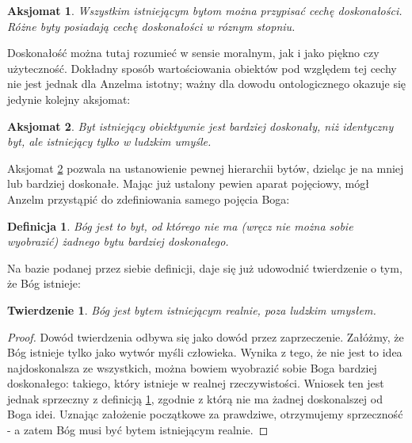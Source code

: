 \documentclass{article}
\newtheorem{theorem}{Twierdzenie}
\newtheorem{definition}{Definicja}
\newtheorem{axiom}{Aksjomat}
\begin{document}
\begin{axiom} \label{axiom:1}
	Wszystkim istniejącym bytom można przypisać cechę \emph{doskonałości}. Różne byty posiadają cechę doskonałości w róznym stopniu. 
\end{axiom}

Doskonałość można tutaj rozumieć w sensie moralnym, jak i jako piękno czy użyteczność. Dokładny sposób wartościowania obiektów pod względem tej cechy nie jest jednak dla Anzelma istotny; ważny dla dowodu ontologicznego okazuje się jedynie kolejny aksjomat:

\begin{axiom} \label{axiom:2}
	Byt istniejący obiektywnie jest bardziej doskonały, niż identyczny byt, ale istniejący tylko w ludzkim umyśle. 
\end{axiom}

Aksjomat \ref{axiom:2} pozwala na ustanowienie pewnej hierarchii bytów, dzieląc je na mniej lub bardziej doskonałe. Mając już ustalony pewien aparat pojęciowy, mógł Anzelm przystąpić do zdefiniowania samego pojęcia Boga:

\begin{definition} \label{def:god}
	Bóg jest to byt, od którego nie ma (wręcz nie można sobie wyobrazić) żadnego bytu bardziej doskonałego. 
\end{definition}

Na bazie podanej przez siebie definicji, daje się już udowodnić twierdzenie o tym, że Bóg istnieje:

\begin{theorem} \label{theorem:god}
	Bóg jest bytem istniejącym realnie, poza ludzkim umysłem. 
\end{theorem}

\begin{proof}
	Dowód twierdzenia odbywa się jako dowód przez zaprzeczenie. Załóżmy, że Bóg istnieje tylko jako wytwór myśli człowieka. Wynika z tego, że nie jest to idea najdoskonalsza ze wszystkich, można bowiem wyobrazić sobie Boga bardziej doskonałego: takiego, który istnieje w realnej rzeczywistości. Wniosek ten jest jednak sprzeczny z definicją \ref{def:god}, zgodnie z którą nie ma żadnej doskonalszej od Boga idei. Uznając założenie początkowe za prawdziwe, otrzymujemy sprzeczność - a zatem Bóg musi być bytem istniejącym realnie. 
\end{proof}
	
\end{document}
